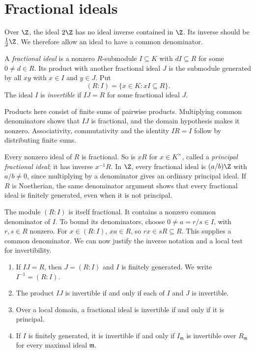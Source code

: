 \section{Fractional ideals}

Over $\Z$, the ideal $2\Z$ has no ideal inverse contained in $\Z$. Its inverse should be $\frac12\Z$. We therefore allow an ideal to have a common denominator.

\begin{definition}\label{def:fractional}
A \emph{fractional ideal} is a nonzero $R$-submodule $I\subseteq K$ with $dI\subseteq R$ for some $0\ne d\in R$. Its product with another fractional ideal $J$ is the submodule generated by all $xy$ with $x\in I$ and $y\in J$. Put
\[
 (R:I)=\{x\in K:xI\subseteq R\}.
\]
The ideal $I$ is \emph{invertible} if $IJ=R$ for some fractional ideal $J$.
\end{definition}

Products here consist of finite sums of pairwise products. Multiplying common denominators shows that $IJ$ is fractional, and the domain hypothesis makes it nonzero. Associativity, commutativity and the identity $IR=I$ follow by distributing finite sums.

Every nonzero ideal of $R$ is fractional. So is $xR$ for $x\in K^\times$, called a \emph{principal fractional ideal}; it has inverse $x^{-1}R$. In $\Z$, every fractional ideal is $(a/b)\Z$ with $a/b\ne0$, since multiplying by a denominator gives an ordinary principal ideal. If $R$ is Noetherian, the same denominator argument shows that every fractional ideal is finitely generated, even when it is not principal.

The module $(R:I)$ is itself fractional. It contains a nonzero common denominator of $I$. To bound its denominators, choose $0\ne a=r/s\in I$, with $r,s\in R$ nonzero. For $x\in(R:I)$, $xa\in R$, so $rx\in sR\subseteq R$. This supplies a common denominator. We can now justify the inverse notation and a local test for invertibility.

\begin{lemma}\label{lem:invertible}
\leavevmode
\begin{enumerate}[label=(\alph*)]
\item If $IJ=R$, then $J=(R:I)$ and $I$ is finitely generated. We write $I^{-1}=(R:I)$.
\item The product $IJ$ is invertible if and only if each of $I$ and $J$ is invertible.
\item Over a local domain, a fractional ideal is invertible if and only if it is principal.
\item If $I$ is finitely generated, it is invertible if and only if $I_{\mathfrak m}$ is invertible over $R_{\mathfrak m}$ for every maximal ideal $\mathfrak m$.
\end{enumerate}
\end{lemma}

